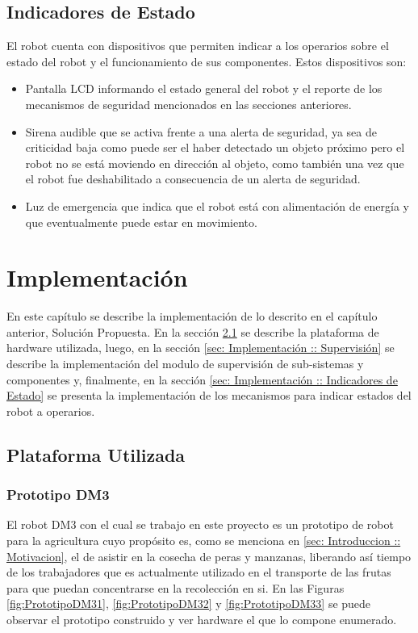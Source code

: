 \documentclass[withindex,glossary]{cam-thesis}
\begin{document}
\section{Indicadores de Estado} \label{sec: sol prop - Indicadores de Estado}
El robot cuenta con dispositivos que permiten indicar a los operarios sobre el estado del robot y el funcionamiento de sus componentes. Estos dispositivos son:
\begin{itemize}
\item Pantalla LCD informando el estado general del robot y el reporte de los mecanismos de seguridad mencionados en las secciones anteriores.
\item Sirena audible que se activa frente a una alerta de seguridad, ya sea de criticidad baja como puede ser el haber detectado un objeto próximo pero el robot no se está moviendo en dirección al objeto, como también una vez que el robot fue deshabilitado a consecuencia de un alerta de seguridad.
\item Luz de emergencia que indica que el robot está con alimentación de energía y que eventualmente puede estar en movimiento.
\end{itemize}

\chapter{Implementación}
En este capítulo se describe la implementación de lo descrito en el capítulo anterior, Solución Propuesta. En la sección \ref{sec: Implementación :: Plataforma Utilizada} se describe la plataforma de hardware utilizada, luego, en la sección \ref{sec: Implementación :: Supervisión} se describe la implementación del modulo de supervisión de sub-sistemas y componentes y, finalmente, en la sección \ref{sec: Implementación :: Indicadores de Estado} se presenta la implementación de los mecanismos para indicar estados del robot a operarios.

\section{Plataforma Utilizada} \label{sec: Implementación :: Plataforma Utilizada}
\subsection{Prototipo DM3}
El robot DM3 con el cual se trabajo en este proyecto es un prototipo de robot para la agricultura cuyo propósito es, como se menciona en \ref{sec: Introduccion :: Motivacion}, el de asistir en la cosecha de peras y manzanas, liberando así tiempo de los trabajadores que es actualmente utilizado en el transporte de las frutas para que puedan concentrarse en la recolección en si. En las Figuras \ref{fig:PrototipoDM31}, \ref{fig:PrototipoDM32} y \ref{fig:PrototipoDM33} se puede observar el prototipo construido y ver hardware el que lo compone enumerado.
\end{document}
